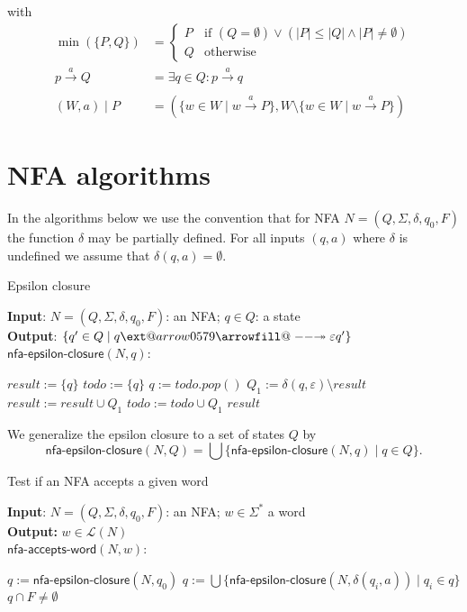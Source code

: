 \documentclass[11pt]{article}
\makeatletter
\newcommand*{\Language}[1]{\ensuremath{\mathcal{L}(#1)}}
\providecommand*{\twoheadrightarrowfill@}{%
  \arrowfill@\relbar\relbar\twoheadrightarrow
}
\providecommand*{\xtwoheadrightarrow}[2][]{%
  \ext@arrow 0579\twoheadrightarrowfill@{#1}{#2}%
}
\makeatother
\begin{document}
with
\begin{align*}
  \min(\{P, Q\}) &= 
  \begin{cases}
     P & \text{if } (Q = \emptyset) \lor (|P| \leq |Q| \land |P| \neq \emptyset) \\
     Q & \text{otherwise}
  \end{cases} \\
  p \xrightarrow[]{a} Q &= \exists q \in Q: p \xrightarrow[]{a} q \\
  (W,a) \mid P &= ( \{w \in W \mid w \xrightarrow{a} P\}, W \setminus \{w \in W \mid w \xrightarrow{a} P\} )
\end{align*}

\clearpage
\section{NFA algorithms}

In the algorithms below we use the convention that for NFA $N = (Q, \Sigma, \delta, q_0, F)$ the function $\delta$ may be partially defined. For all inputs $(q,a)$ where $\delta$ is undefined we
assume that $\delta(q,a) = \emptyset$.

\begin{algorithm}
\small
\caption{Epsilon closure}
\vspace*{1ex}
{\textbf{Input}:}
$N = (Q, \Sigma, \delta, q_0, F)$: an NFA; $q \in Q$: a state \\
{\textbf{Output}:}
$\{ q' \in Q \mid q \xtwoheadrightarrow{\varepsilon} q' \}$ \\

$\textsf{nfa-epsilon-closure}(N, q)$:
\begin{algorithmic}[1]
\State $result := \{ q \}$
\State $todo := \{ q \}$
  \State $q := todo.pop()$ 
  \State $Q_1 := \delta(q, \varepsilon) \setminus result$
  \State $result := result \cup Q_1$
  \State $todo := todo \cup Q_1$
\EndWhile
\State \Return $result$
\end{algorithmic}
\end{algorithm}

We generalize the epsilon closure to a set of states $Q$ by
\[
\textsf{nfa-epsilon-closure}(N, Q) = \bigcup \{ \textsf{nfa-epsilon-closure}(N, q) \mid q \in Q \}.
\]

\begin{algorithm}
\small
\caption{Test if an NFA accepts a given word }
\vspace*{1ex}
{\textbf{Input}:} 
$N = (Q, \Sigma, \delta, q_0, F)$: an NFA; $w \in \Sigma^*$ a word \\
\textbf{Output:}
$w \in \Language{N}$ \\

$\textsf{nfa-accepts-word}(N, w)$:
\begin{algorithmic}[1]
\State $q := \textsf{nfa-epsilon-closure}(N, q_0)$
  \State $q := \bigcup \{ \textsf{nfa-epsilon-closure}(N, \delta(q_i, a)) \mid q_i \in q \}$
\EndFor
\State \Return $q \cap F \neq \emptyset$
\end{algorithmic}
\end{algorithm}
\end{document}
